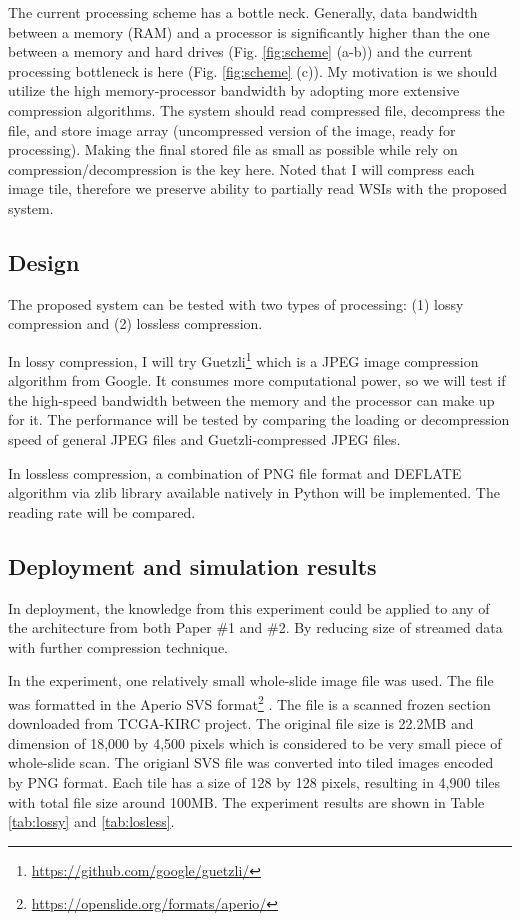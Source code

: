 \documentclass{article}
\begin{document}
The current processing scheme has a bottle neck. Generally, data bandwidth between a memory (RAM) and a processor is significantly higher than the one between a memory and hard drives (Fig. \ref{fig:scheme} (a-b)) and the current processing bottleneck is here (Fig. \ref{fig:scheme} (c)). My motivation is we should utilize the high memory-processor bandwidth by adopting more extensive compression algorithms. The system should read compressed file, decompress the file, and store image array (uncompressed version of the image, ready for processing). Making the final stored file as small as possible while rely on compression/decompression is the key here. Noted that I will compress each image tile, therefore we preserve ability to partially read WSIs with the proposed system. 

\subsection{Design}
The proposed system can be tested with two types of processing: (1) lossy compression and (2) lossless compression. 

In lossy compression, I will try Guetzli\footnote{\url{https://github.com/google/guetzli/}} which is a JPEG image compression algorithm from Google. It consumes more computational power, so we will test if the high-speed bandwidth between the memory and the processor can make up for it. The performance will be tested by comparing the loading or decompression speed of general JPEG files and Guetzli-compressed JPEG files. 

In lossless compression, a combination of PNG file format and DEFLATE algorithm via zlib library available natively in Python will be implemented. The reading rate will be compared. 

\subsection{Deployment and simulation results}
In deployment, the knowledge from this experiment could be applied to any of the architecture from both Paper \#1 and \#2. By reducing size of streamed data with further compression technique. 

In the experiment, one relatively small whole-slide image file was used. The file was formatted in the Aperio SVS format\footnote{\url{https://openslide.org/formats/aperio/}} \cite{Goode2013}. The file is a scanned frozen section downloaded from TCGA-KIRC project. The original file size is 22.2MB and dimension of 18,000 by 4,500 pixels which is considered to be very small piece of whole-slide scan. The origianl SVS file was converted into tiled images encoded by PNG format. Each tile has a size of 128 by 128 pixels, resulting in 4,900 tiles with total file size around 100MB. The experiment results are shown in Table \ref{tab:lossy} and \ref{tab:losless}. 
\end{document}
